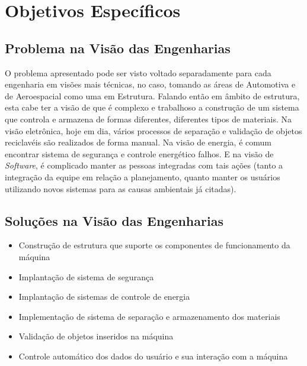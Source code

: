 \section{Objetivos Específicos}

\subsection{Problema na Visão das Engenharias}
O problema apresentado pode ser visto voltado separadamente para cada engenharia em visões mais técnicas, no caso, tomando as áreas de Automotiva e de Aeroespacial como uma em Estrutura. Falando então em âmbito de estrutura, esta cabe ter a visão de que é complexo e trabalhoso a construção de um sistema que controla e armazena de formas diferentes, diferentes tipos de materiais. Na visão eletrônica, hoje em dia, vários processos de separação e validação de objetos reciclavéis são realizados de forma manual. Na visão de energia, é comum encontrar sistema de segurança e controle energético falhos. E na visão de \textit{Software}, é complicado manter as pessoas integradas com tais ações (tanto a integração da equipe em relação a planejamento, quanto manter os usuários utilizando novos sistemas para as causas ambientais já citadas).

\subsection{Soluções na Visão das Engenharias}
\begin{itemize}
\item Construção de estrutura que suporte os componentes de funcionamento da máquina
\item Implantação de sistema de segurança
\item Implantação de sistemas de controle de energia
\item Implementação de sistema de separação e armazenamento dos materiais
\item Validação de objetos inseridos na máquina
\item Controle automático dos dados do usuário e sua interação com a máquina
\end{itemize}